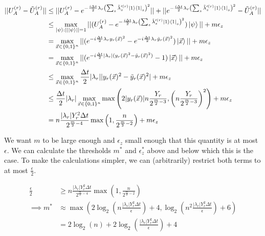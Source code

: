 \begin{equation}
    \begin{split}
        ||U_A^{(r)} - \tilde{U}_A^{(r)}|| &\leq ||U_A^{(r)} - e^{-\frac{i\Delta t}{2}\lambda_r\left(\sum_s \tilde{\lambda}'^{(r)}_s \ket{1}\bra{1}_s\right)^2}|| + ||e^{-\frac{i\Delta t}{2}\lambda_r\left(\sum_s \tilde{\lambda}'^{(r)}_s \ket{1}\bra{1}_s\right)^2} - \tilde{U}_A^{(r)}|| \\
        &\leq \max_{\ket{\psi} : ||\ket{\psi}|| = 1} ||(U_A^{(r)} - e^{-\frac{i\Delta t}{2}\lambda_r\left(\sum_s \tilde{\lambda}'^{(r)}_s \ket{1}\bra{1}_s\right)^2})\ket{\psi}|| + m\epsilon_z \\
        &= \max_{\vec{x} \in \{0, 1\}^n} ||(e^{-i\frac{\Delta t}{2}\lambda_ry_r(\vec{x})^2} - e^{-i\frac{\Delta t}{2}\lambda_r\tilde{y}_r(\vec{x})^2})\ket{\vec{x}}|| + m\epsilon_z \\
        &= \max_{\vec{x} \in \{0, 1\}^n} ||(e^{-i\frac{\Delta t}{2}|\lambda_r|(y_r(\vec{x})^2 - \tilde{y}_r(\vec{x})^2)} - 1)\ket{\vec{x}}|| + m\epsilon_z \\
        &\leq \max_{\vec{x} \in \{0, 1\}^n} \frac{\Delta t}{2}|\lambda_r||y_r(\vec{x})^2 - \tilde{y}_r(\vec{x})^2| + m\epsilon_z \\
        &\leq \frac{\Delta t}{2}|\lambda_r|\max_{\vec{x} \in \{0, 1\}^n} \max\left(2|y_r(\vec{x})|n\frac{Y_r}{2^{\frac{m}{2} - 3}}, \left(n\frac{Y_r}{2^{\frac{m}{2} - 3}}\right)^2\right) + m\epsilon_z \\
        &= n\frac{|\lambda_r| Y_r^2\Delta t}{2^{\frac{m}{2} - 4}}\max\left(1, \frac{n}{2^{\frac{m}{2} - 2}}\right) + m\epsilon_z
    \end{split}
\end{equation}

We want $m$ to be large enough and $\epsilon_z$ small enough that this quantity is at most $\epsilon$. We can calculate the thresholds $m^*$ and $\epsilon_z^*$ above and below which this is the case. To make the calculations simpler, we can (arbitrarily) restrict both terms to at most $\frac{\epsilon}{2}$.

\begin{equation}
    \begin{split}
        \frac{\epsilon}{2} &\geq n\frac{|\lambda_r| Y_r^2\Delta t}{2^{\frac{m}{2} - 4}}\max\left(1, \frac{n}{2^{\frac{m}{2} - 2}}\right) \\
        \implies m^* &\approx \max(2\log_2\left(n\frac{|\lambda_r|Y_r^2\Delta t}{\epsilon}\right) + 4, \log_2\left(n^2\frac{|\lambda_r|Y_r^2\Delta t}{\epsilon}\right) + 6) \\
        &= 2\log_2(n) + 2\log_2\left(\frac{|\lambda_r|Y_r^2\Delta t}{\epsilon}\right) + 4 \label{eq: m_min}
    \end{split}
\end{equation}

